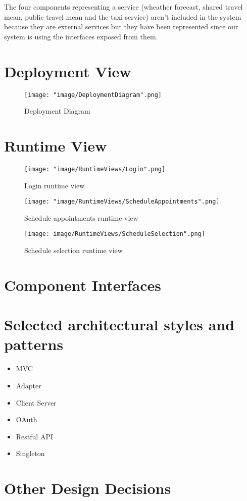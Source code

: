 The four components representing a service (wheather forecast, shared travel mean, public travel mean and the taxi service) aren't included in the system because they are external services but they have been represented since our system is using the interfaces exposed from them.

\section{Deployment View}

\begin{figure}[H]
\begin{center}
\texttt{[image: "image/DeploymentDiagram".png]}
\caption{Deployment Diagram}
\end{center}
\end{figure}

\section{Runtime View}

\begin{figure}[H]
\begin{center}
\texttt{[image: "image/RuntimeViews/Login".png]}
\caption{Login runtime view}
\end{center}
\end{figure}

\begin{figure}[H]
\begin{center}
\texttt{[image: "image/RuntimeViews/ScheduleAppointments".png]}
\caption{Schedule appointments runtime view}
\end{center}
\end{figure}

\begin{figure}[H]
\begin{center}
\texttt{[image: image/RuntimeViews/ScheduleSelection".png]}
\caption{Schedule selection runtime view }
\end{center}
\end{figure}

\section{Component Interfaces}

\section{Selected architectural styles and patterns}
\begin{itemize}
\item MVC
\item Adapter
\item Client Server
\item OAuth
\item Restful API
\item Singleton
\end{itemize}

\section{Other Design Decisions}